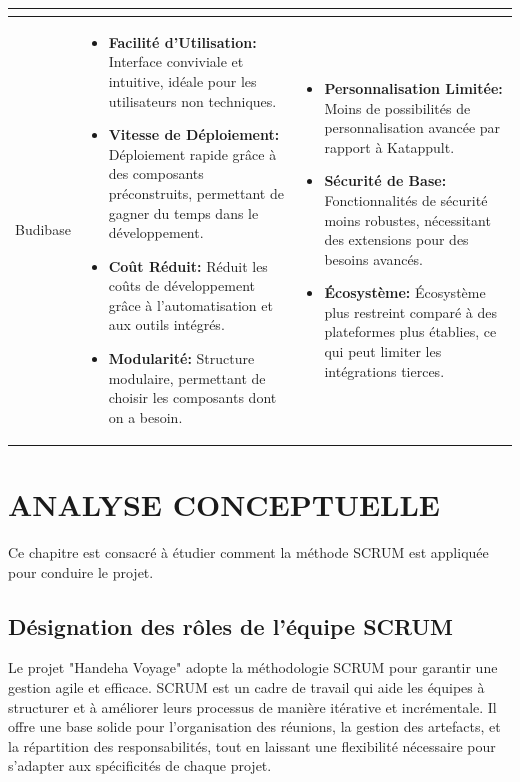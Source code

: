 \documentclass[12pt]{report}
\begin{document}
\begin{longtable}{|p{3cm}|p{5.5cm}|p{5.5cm}|}
\begin{itemize}
						\end{itemize}\\						
						\hline
						Budibase&
						\begin{itemize}
							\item \textbf{Facilité d'Utilisation:} Interface conviviale et intuitive, idéale pour les utilisateurs non techniques.
							\item \textbf{Vitesse de Déploiement:} Déploiement rapide grâce à des composants préconstruits, permettant de gagner du temps dans le développement.
							\item \textbf{Coût Réduit:} Réduit les coûts de développement grâce à l'automatisation et aux outils intégrés.
							\item \textbf{Modularité:} Structure modulaire, permettant de choisir les composants dont on a besoin.
						\end{itemize} &
						\begin{itemize}
							\item \textbf{Personnalisation Limitée:} Moins de possibilités de personnalisation avancée par rapport à Katappult.
							\item \textbf{Sécurité de Base:} Fonctionnalités de sécurité moins robustes, nécessitant des extensions pour des besoins avancés.
							\item \textbf{Écosystème:} Écosystème plus restreint comparé à des plateformes plus établies, ce qui peut limiter les intégrations tierces.
						\end{itemize} \\
						\hline
				    \end{longtable}


				\chapter{ANALYSE CONCEPTUELLE}

				\hspace{15pt} Ce chapitre est consacré à étudier comment la méthode SCRUM est appliquée pour conduire le projet.

				\section{Désignation des rôles de l’équipe SCRUM}

				\hspace{15pt} Le projet "Handeha Voyage" adopte la méthodologie SCRUM pour garantir une gestion agile et efficace. SCRUM est un cadre de travail qui aide les équipes à structurer et à améliorer leurs processus de manière itérative et incrémentale. Il offre une base solide pour l'organisation des réunions, la gestion des artefacts, et la répartition des responsabilités, tout en laissant une flexibilité nécessaire pour s'adapter aux spécificités de chaque projet.
\end{document}
